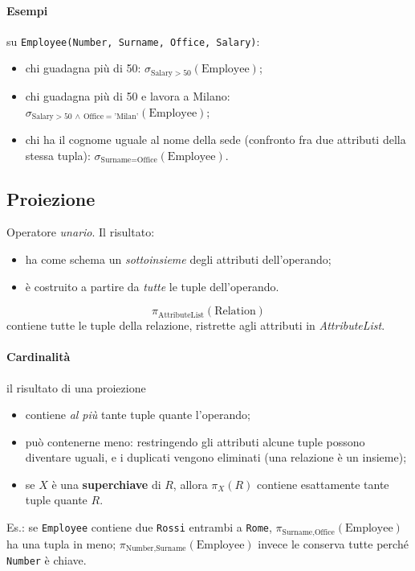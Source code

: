\documentclass[a4paper,12pt]{article}
\begin{document}
\paragraph{Esempi} su \texttt{Employee(Number, Surname, Office, Salary)}:
\begin{itemize}
  \item chi guadagna più di 50:
    $\sigma_{\text{Salary} > 50}(\text{Employee})$;
  \item chi guadagna più di 50 e lavora a Milano:
    $\sigma_{\text{Salary} > 50 \,\wedge\, \text{Office} = \text{'Milan'}}
    (\text{Employee})$;
  \item chi ha il cognome uguale al nome della sede (confronto fra due
    attributi della stessa tupla):
    $\sigma_{\text{Surname} = \text{Office}}(\text{Employee})$.
\end{itemize}

\subsection{Proiezione}

Operatore \emph{unario}. Il risultato:
\begin{itemize}
  \item ha come schema un \emph{sottoinsieme} degli attributi dell'operando;
  \item è costruito a partire da \emph{tutte} le tuple dell'operando.
\end{itemize}
\[
  \pi_{\text{AttributeList}}(\text{Relation})
\]
contiene tutte le tuple della relazione, ristrette agli attributi in
\emph{AttributeList}.

\paragraph{Cardinalità} il risultato di una proiezione
\begin{itemize}
  \item contiene \emph{al più} tante tuple quante l'operando;
  \item può contenerne meno: restringendo gli attributi alcune tuple possono
    diventare uguali, e i duplicati vengono eliminati (una relazione è un
    insieme);
  \item se $X$ è una \textbf{superchiave} di $R$, allora $\pi_X(R)$ contiene
    esattamente tante tuple quante $R$.
\end{itemize}
Es.: se \texttt{Employee} contiene due \texttt{Rossi} entrambi a \texttt{Rome},
$\pi_{\text{Surname},\text{Office}}(\text{Employee})$ ha una tupla in meno;
$\pi_{\text{Number},\text{Surname}}(\text{Employee})$ invece le conserva tutte
perché \texttt{Number} è chiave.
\end{document}
